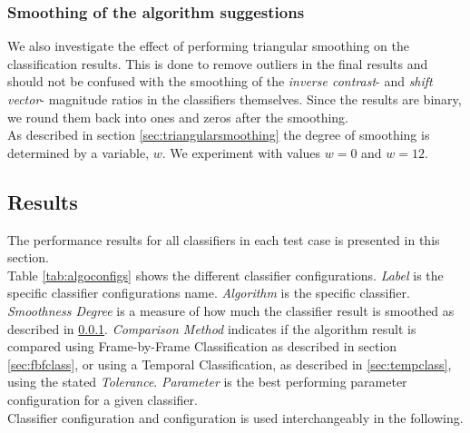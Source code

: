 \subsubsection{Smoothing of the algorithm suggestions}\label{sec:classsmooth}
%
We also investigate the effect of performing triangular smoothing on the classification results. This is done to remove outliers in the final results and should not be confused with the smoothing of the \textit{inverse contrast}- and \textit{shift vector}- magnitude ratios in the classifiers themselves. Since the results are binary, we round them back into ones and zeros after the smoothing.\\
As described in section \ref{sec:triangularsmoothing} the degree of smoothing is determined by a variable, $w$. We experiment with values $w=0$ and $w=12$.
%
\subsection{Results}
%
The performance results for all classifiers in each test case is presented in this section.\\
Table \ref{tab:algoconfigs} shows the different classifier configurations. \textit{Label} is the specific classifier configurations name. \textit{Algorithm} is the specific classifier. \textit{Smoothness Degree} is a measure of how much the classifier result is smoothed as described in \ref{sec:classsmooth}. \textit{Comparison Method} indicates if the algorithm result is compared using Frame-by-Frame Classification as described in section \ref{sec:fbfclass}, or using a Temporal Classification, as described in \ref{sec:tempclass}, using the stated \textit{Tolerance}. \textit{Parameter} is the best performing parameter configuration for a given classifier.\\
Classifier configuration and configuration is used interchangeably in the following.
%
